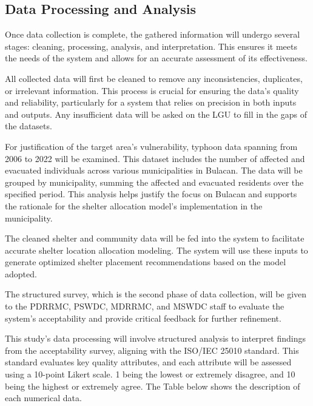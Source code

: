 \subsection{Data Processing and Analysis}
	Once data collection is complete, the gathered information will undergo several stages: cleaning, processing, analysis, and interpretation. This ensures it meets the needs of the system and allows for an accurate assessment of its effectiveness.
	
	All collected data will first be cleaned to remove any inconsistencies, duplicates, or irrelevant information. This process is crucial for ensuring the data’s quality and reliability, particularly for a system that relies on precision in both inputs and outputs. Any insufficient data will be asked on the LGU to fill in the gaps of the datasets. 
	
	For justification of the target area’s vulnerability, typhoon data spanning from 2006 to 2022 will be examined. This dataset includes the number of affected and evacuated individuals across various municipalities in Bulacan. The data will be grouped by municipality, summing the affected and evacuated residents over the specified period. This analysis helps justify the focus on Bulacan and supports the rationale for the shelter allocation model’s implementation in the municipality.
	
	The cleaned shelter and community data will be fed into the system to facilitate accurate shelter location allocation modeling. The system will use these inputs to generate optimized shelter placement recommendations based on the model adopted.
	
	The structured survey, which is the second phase of data collection, will be given to the PDRRMC, PSWDC, MDRRMC, and MSWDC staff to evaluate the system's acceptability and provide critical feedback for further refinement.
	
	This study's data processing will involve structured analysis to interpret findings from the acceptability survey, aligning with the ISO/IEC 25010 standard. This standard evaluates key quality attributes, and each attribute will be assessed using a 10-point Likert scale. 1 being the lowest or extremely disagree, and 10 being the highest or extremely agree. The Table below shows the description of each numerical data.
	
